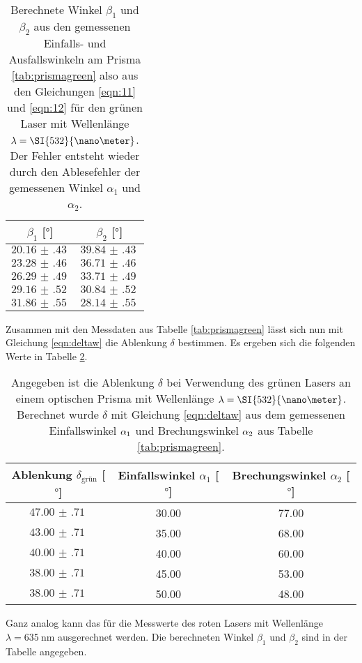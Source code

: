 \begin{table}
    \centering
    \caption{Berechnete Winkel $\beta_1$ und $\beta_2$ aus den gemessenen Einfalls- und Ausfallswinkeln am Prisma \ref{tab:prismagreen} also aus den Gleichungen \eqref{eqn:11} und \eqref{eqn:12} für den grünen Laser mit Wellenlänge $\protect \lambda = \SI{532}{\nano\meter}$. Der Fehler entsteht wieder durch
    den Ablesefehler der gemessenen Winkel $\alpha_1$ und $\alpha_2$.}
    \label{tab:prismagreenber}
    \begin{tabular}{c c}
        \toprule
        $\beta_1$ [$\si{\degree}$] & $\beta_2$ [$\si{\degree}$] \\
        \midrule
        $\SI{20.16(43)}{}$ & $\SI{39.84(43)}{}$\\
        $\SI{23.28(46)}{}$ & $\SI{36.71(46)}{}$\\  
        $\SI{26.29(49)}{}$ & $\SI{33.71(49)}{}$\\
        $\SI{29.16(52)}{}$ & $\SI{30.84(52)}{}$\\
        $\SI{31.86(55)}{}$ & $\SI{28.14(55)}{}$\\
        \bottomrule    
    \end{tabular}
\end{table}

Zusammen mit den Messdaten aus Tabelle \ref{tab:prismagreen} lässt sich nun mit Gleichung \eqref{eqn:deltaw} die Ablenkung $\delta$ bestimmen. Es ergeben sich die folgenden Werte in Tabelle \ref{tab:keinb}.
\begin{table}
    \centering
    \caption{Angegeben ist die Ablenkung $\delta$ bei Verwendung des grünen Lasers an einem optischen Prisma mit Wellenlänge $\protect \lambda = \SI{532}{\nano\meter}$. Berechnet wurde $\delta$ mit Gleichung \eqref{eqn:deltaw} aus dem gemessenen Einfallswinkel $\protect \alpha_1$ und Brechungswinkel $\protect \alpha_2$ aus Tabelle \ref{tab:prismagreen}. }
    \label{tab:keinb}
    \begin{tabular}{c | c c}
        \toprule
        Ablenkung $\delta_{\text{grün}}$ [$\si{\degree}$] & Einfallswinkel $\alpha_1$ [$\si{\degree}$] & Brechungswinkel $\alpha_2$ [$\si{\degree}$] \\
        \midrule
        $\SI{47.00(71)}{}$ & 30.00 & 77.00 \\
        $\SI{43.00(71)}{}$ & 35.00 & 68.00 \\
        $\SI{40.00(71)}{}$ & 40.00 & 60.00 \\ 
        $\SI{38.00(71)}{}$ & 45.00 & 53.00 \\
        $\SI{38.00(71)}{}$ & 50.00 & 48.00 \\
        \bottomrule    
    \end{tabular}
\end{table}
Ganz analog kann das für die Messwerte des roten Lasers mit Wellenlänge $\lambda = \SI{635}{\nano\meter}$ ausgerechnet werden.
Die berechneten Winkel $\beta_1$ und $\beta_2$ sind in der Tabelle \label{tab:prismaredber} angegeben.

